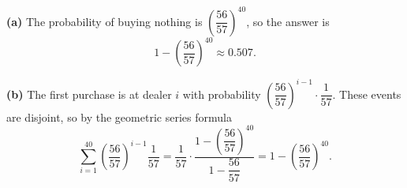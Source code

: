 \textbf{(a)} The probability of buying nothing is $\left(\dfrac{56}{57}\right)^{40}$, so the answer is
\[\boxed{1-\left(\dfrac{56}{57}\right)^{40}\approx0.507}.\]

\textbf{(b)} The first purchase is at dealer $i$ with probability $\left(\dfrac{56}{57}\right)^{i-1}\cdot\dfrac1{57}$. These events are disjoint, so by the geometric series formula
\[\sum_{i=1}^{40}\left(\dfrac{56}{57}\right)^{i-1}\dfrac{1}{57}=\dfrac{1}{57}\cdot\dfrac{1-\left(\dfrac{56}{57}\right)^{40}}{1-\dfrac{56}{57}}=1-\left(\dfrac{56}{57}\right)^{40}.\]
